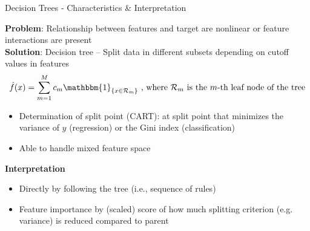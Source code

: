 \documentclass[11pt,compress,t,notes=noshow, aspectratio=169, xcolor=table]{beamer}
\begin{document}

\begin{frame}{Decision Trees - Characteristics \& Interpretation}

\textbf{Problem}: Relationship between features and target are nonlinear or feature interactions are present\\
\medskip
\pause
\textbf{Solution}: Decision tree  -- Split data in different subsets depending on cutoff values in features 
$$
\hat f(x) = \sum_{m=1}^M c_m \mathbbm{1}_{\{x \in \mathcal{R}_m\}}\text{ ,  where $\mathcal{R}_m$ is the $m$-th leaf node of the tree}
$$

\begin{itemize}
    \item Determination of split point (CART): at split point that minimizes the variance of $y$ (regression) or the Gini index (classification)
    \item Able to handle mixed feature space
\end{itemize}

\pause
\textbf{Interpretation}
\begin{itemize}
    \item Directly by following the tree (i.e., sequence of rules)
    \item Feature importance by (scaled) score of how much splitting criterion (e.g. variance) is reduced compared to parent
\end{itemize}



\end{frame}
\end{document}
